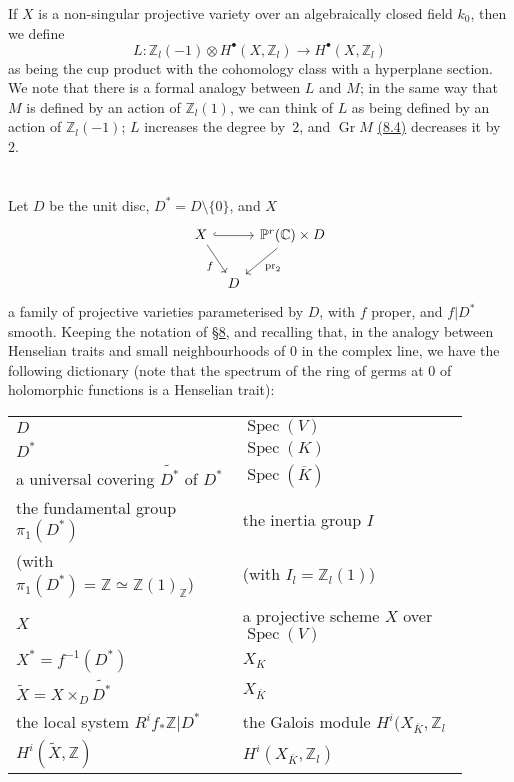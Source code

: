 \documentclass{article}
\theoremstyle{plain}
\theoremstyle{definition}
\newenvironment{env}[1]
    {\renewcommand\theinnerenv{#1}\innerenv}
    {\endinnerenv}
\newcommand{\ZZ}{\mathbb{Z}}
\newcommand{\CC}{\mathbb{C}}
\newcommand{\PP}{\mathbb{P}}
\DeclareMathOperator{\Gr}{Gr}
\DeclareMathOperator{\Spec}{Spec}
\newcommand{\oldpage}[1]{\marginpar{\footnotesize$\Big\vert$ \textit{p.~#1}}}
\begin{document}
\oldpage{429}
\begin{env}{8.5}
\label{8.5}
  If $X$ is a non-singular projective variety over an algebraically closed field $k_0$, then we define
  \[
    L\colon \ZZ_l(-1)\otimes H^\bullet(X,\ZZ_l) \to H^\bullet(X,\ZZ_l)
  \]
  as being the cup product with the cohomology class with a hyperplane section.
  We note that there is a formal analogy between $L$ and $M$;
  in the same way that $M$ is defined by an action of $\ZZ_l(1)$, we can think of $L$ as being defined by an action of $\ZZ_l(-1)$;
  $L$ increases the degree by~$2$, and $\Gr M$ \hyperref[8.4]{(8.4)} decreases it by~$2$.
\end{env}


\section{}
\label{9}

Let $D$ be the unit disc, $D^*=D\setminus\{0\}$, and $X$
\[
  \begin{tikzcd}[column sep=tiny]
    X \ar[rr,hook] \ar[dr,swap,"f"]
    && \PP^r(\CC)\times D \ar[dl,"\mathrm{pr}_2"]
  \\&D&
  \end{tikzcd}
\]
a family of projective varieties parameterised by $D$, with $f$ proper, and $f|D^*$ smooth.
Keeping the notation of \hyperref[8]{\S8}, and recalling that, in the analogy between Henselian traits and small neighbourhoods of $0$ in the complex line, we have the following dictionary (note that the spectrum of the ring of germs at $0$ of holomorphic functions is a Henselian trait):

\begin{env}{9.1}
  \phantom{}
  \begin{tabular}{p{0.45\linewidth}|p{0.45\linewidth}}
    \toprule
    $D$
    & $\Spec(V)$
  \\$D^*$
    & $\Spec(K)$
  \\a universal covering $\widetilde{D^*}$ of $D^*$
    & $\Spec(\overline{K})$
  \\the fundamental group $\pi_1(D^*)$
    & the inertia group $I$
  \\(with $\pi_1(D^*)=\ZZ\simeq\ZZ(1)_\ZZ$)
    & (with $I_l=\ZZ_l(1)$)
  \\$X$
    & a projective scheme $X$ over $\Spec(V)$
  \\$X^*=f^{-1}(D^*)$
    & $X_K$
  \\$\widetilde{X}=X\times_D\widetilde{D^*}$
    & $X_{\overline{K}}$
  \\the local system $R^if_*\ZZ|D^*$
    & the Galois module $H^i(X_{\overline{K}},\ZZ_l$
  \\$H^i(\widetilde{X},\ZZ)$
    & $H^i(X_{\overline{K}},\ZZ_l)$
  \end{tabular}
\end{env}
\end{document}
